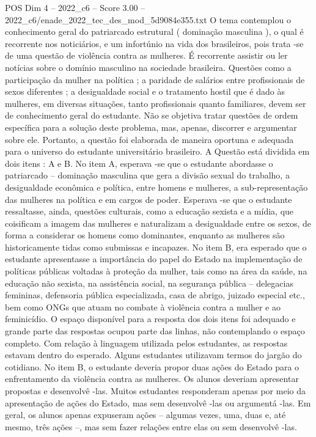 \begin{textsample}{POS Dim 4 – 2022\_c6 – Score 3.00 – 2022\_c6/enade\_2022\_tec\_des\_mod\_5d9084e355.txt}
O tema contemplou o conhecimento geral do patriarcado estrutural ( dominação masculina ), o qual é recorrente nos noticiários, e um infortúnio na vida dos brasileiros, pois trata -se de uma questão de violência contra as mulheres.
É recorrente assistir ou ler notícias sobre o domínio masculino na sociedade brasileira.
Questões como a participação da mulher na política ; a paridade de salários entre profissionais de sexos diferentes ; a desigualdade social e o tratamento hostil que é dado às mulheres, em diversas situações, tanto profissionais quanto familiares, devem ser de conhecimento geral do estudante.
Não se objetiva tratar questões de ordem específica para a solução deste problema, mas, apenas, discorrer e argumentar sobre ele.
Portanto, a questão foi elaborada de maneira oportuna e adequada para o universo do estudante universitário brasileiro.
A Questão está dividida em dois itens : A e B.
No item A, esperava -se que o estudante abordasse o patriarcado – dominação masculina que gera a divisão sexual do trabalho, a desigualdade econômica e política, entre homens e mulheres, a sub-representação das mulheres na política e em cargos de poder.
Esperava -se que o estudante ressaltasse, ainda, questões culturais, como a educação sexista e a mídia, que coisificam a imagem das mulheres e naturalizam a desigualdade entre os sexos, de forma a considerar os homens como dominantes, enquanto as mulheres são historicamente tidas como submissas e incapazes.
No item B, era esperado que o estudante apresentasse a importância do papel do Estado na implementação de políticas públicas voltadas à proteção da mulher, tais como na área da saúde, na educação não sexista, na assistência social, na segurança pública – delegacias femininas, defensoria pública especializada, casa de abrigo, juizado especial etc., bem como ONGs que atuam no combate à violência contra a mulher e ao feminicídio.
O espaço disponível para a resposta dos dois itens foi adequado e grande parte das respostas ocupou parte das linhas, não contemplando o espaço completo.
Com relação à linguagem utilizada pelos estudantes, as respostas estavam dentro do esperado.
Alguns estudantes utilizavam termos do jargão do cotidiano.
No item B, o estudante deveria propor duas ações do Estado para o enfrentamento da violência contra as mulheres.
Os alunos deveriam apresentar propostas e desenvolvê -las.
Muitos estudantes responderam apenas por meio da apresentação de ações do Estado, mas sem desenvolvê -las ou argumentá -las.
Em geral, os alunos apenas expuseram ações – algumas vezes, uma, duas e, até mesmo, três ações –, mas sem fazer relações entre elas ou sem desenvolvê -las.

\end{textsample}
